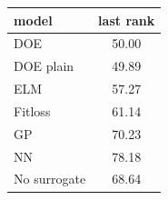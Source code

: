 \begin{tabular}{|lc|}
\hline
model & last rank\\
\hline
DOE & 50.00 \\
DOE plain & 49.89 \\
ELM & 57.27 \\
Fitloss & 61.14 \\
GP & 70.23 \\
NN & 78.18 \\
No surrogate & 68.64 \\
\hline
\end{tabular}
